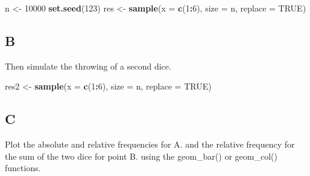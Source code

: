 \documentclass[
]{article}
\newenvironment{Shaded}{\begin{snugshade}}{\end{snugshade}}
\newcommand{\DataTypeTok}[1]{\textcolor[rgb]{0.13,0.29,0.53}{#1}}
\newcommand{\DecValTok}[1]{\textcolor[rgb]{0.00,0.00,0.81}{#1}}
\newcommand{\KeywordTok}[1]{\textcolor[rgb]{0.13,0.29,0.53}{\textbf{#1}}}
\newcommand{\NormalTok}[1]{#1}
\newcommand{\OperatorTok}[1]{\textcolor[rgb]{0.81,0.36,0.00}{\textbf{#1}}}
\newcommand{\OtherTok}[1]{\textcolor[rgb]{0.56,0.35,0.01}{#1}}
\newcommand{\StringTok}[1]{\textcolor[rgb]{0.31,0.60,0.02}{#1}}
\begin{document}
\begin{Shaded}
\begin{Highlighting}[]
\NormalTok{n \textless{}{-}}\StringTok{ }\DecValTok{10000}
\KeywordTok{set.seed}\NormalTok{(}\DecValTok{123}\NormalTok{)}
\NormalTok{res \textless{}{-}}\StringTok{ }\KeywordTok{sample}\NormalTok{(}\DataTypeTok{x =} \KeywordTok{c}\NormalTok{(}\DecValTok{1}\OperatorTok{:}\DecValTok{6}\NormalTok{), }\DataTypeTok{size =}\NormalTok{ n, }\DataTypeTok{replace =} \OtherTok{TRUE}\NormalTok{)}
\end{Highlighting}
\end{Shaded}

\hypertarget{b-3}{%
\subsection{B}\label{b-3}}

Then simulate the throwing of a second dice.

\begin{Shaded}
\begin{Highlighting}[]
\NormalTok{res2 \textless{}{-}}\StringTok{ }\KeywordTok{sample}\NormalTok{(}\DataTypeTok{x =} \KeywordTok{c}\NormalTok{(}\DecValTok{1}\OperatorTok{:}\DecValTok{6}\NormalTok{), }\DataTypeTok{size =}\NormalTok{ n, }\DataTypeTok{replace =} \OtherTok{TRUE}\NormalTok{)}
\end{Highlighting}
\end{Shaded}

\hypertarget{c-2}{%
\subsection{C}\label{c-2}}

Plot the absolute and relative frequencies for A. and the relative
frequency for the sum of the two dice for point B. using the geom\_bar()
or geom\_col() functions.
\end{document}

